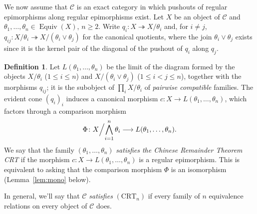 \documentclass[11pt,a4paper]{article}
\theoremstyle{plain}
\theoremstyle{definition}
\newtheorem{definition}[theoreme]{Definition}
\theoremstyle{remark}
\theoremstyle{plain}
\newcommand{\C}{\mathcal{C}}
\newcommand{\Equiv}{\operatorname{Equiv}}
\begin{document}
We now assume that $\C$ is an exact category in which pushouts of regular epimorphisms along regular epimorphisms exist.  Let $X$ be an object of $\C$ and
$\theta_1, \dots, \theta_n \in \Equiv(X)$, $n \ge 2$. Write
$q_i \colon X \twoheadrightarrow X/\theta_i$ and, for $i \ne j$,
$q_{ij} \colon X/\theta_i \twoheadrightarrow X/(\theta_i \vee \theta_j)$ for
the canonical quotients, where the join $\theta_i \vee \theta_j$ exists since it is the kernel pair of the diagonal of the pushout of $q_i$ along $q_j$. 

\begin{definition}\label{def:trc}
Let $L(\theta_1,\dots,\theta_n)$ be the limit of the diagram formed by the
objects $X/\theta_i$ ($1 \le i \le n$) and $X/(\theta_i \vee \theta_j)$
($1 \le i < j \le n$), together with the morphisms $q_{ij}$; it is the
subobject of $\prod_i X/\theta_i$ of \emph{pairwise compatible} families.
The evident cone $(q_i)_i$ induces a canonical morphism
$c \colon X \to L(\theta_1,\dots,\theta_n)$, which factors through a comparison
morphism
\[
\Phi \colon X\Bigl/\bigwedge_{i=1}^n \theta_i
\longrightarrow L(\theta_1,\dots,\theta_n).
\]
We say that the family $(\theta_1,\dots,\theta_n)$ \emph{satisfies the Chinese Remainder Theorem CRT}
if the morphism $c \colon X \to L(\theta_1,\dots,\theta_n)$ is a regular epimorphism. This is equivalent to asking that the comparison morphism $\Phi$ is an isomorphism (Lemma~\ref{lem:mono} below).

In general, we'll say that $\C$ \emph{satisfies}
$(\mathrm{CRT}_n)$ if every family of $n$ equivalence relations on every object of
$\C$ does.
\end{definition}
\end{document}

